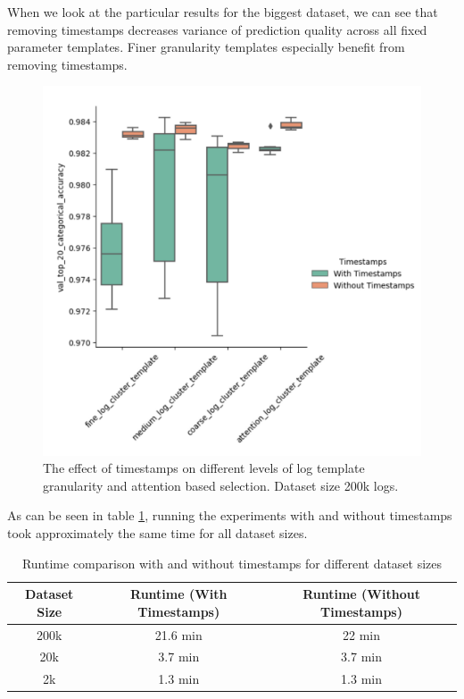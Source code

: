 When we look at the particular results for the biggest dataset, we can see that removing timestamps decreases variance of prediction quality across all fixed parameter templates. Finer granularity templates especially benefit from removing timestamps. 
\begin{figure}[H]
    \centering
    \includegraphics[keepaspectratio=true,scale=0.8]{figures/5_results/Timestamps_templates.png}
    \caption{The effect of timestamps on different levels of log template granularity and attention based selection. Dataset size 200k logs.}
    \label{fig:TimestampsTemplates}
\end{figure}

As can be seen in table \ref{tab:runtimes}, running the experiments with and without timestamps took approximately the same time for all dataset sizes. 
\begin{table}[htbp]
  \centering
  \begin{tabular}{ccc}
    \hline
    \textbf{Dataset Size} & \textbf{Runtime (With Timestamps)} & \textbf{Runtime (Without Timestamps)} \\
    \hline
    200k & 21.6 min & 22 min \\
    20k & 3.7 min & 3.7 min \\
    2k & 1.3 min & 1.3 min \\
        \hline

  \end{tabular}
    \caption{Runtime comparison with and without timestamps for different dataset sizes}
      \label{tab:runtimes}

\end{table}


